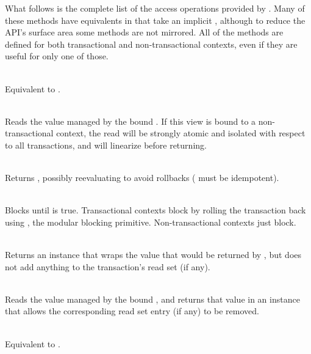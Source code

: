 What follows is the complete list of the access operations provided by
.  Many of these methods have equivalents in 
that take an implicit , although to reduce the API's surface
area some methods are not mirrored.  All of the methods are defined
for both transactional and non-transactional contexts, even if they are
useful for only one of those.

{
\setlength{\leftskip}{12pt}
\setlength{\parindent}{-12pt}
\setlength{\parskip}{3pt}

\vspace{2pt}

\\ Equivalent to .

\\ Reads the value managed by the
bound .  If this view is bound to a non-transactional context,
the read will be strongly atomic and isolated with respect to all
transactions, and will linearize before returning.

\code{map[}\code{](f: }\code{ => }\code{): }\\
Returns , possibly reevaluating 
to avoid rollbacks ( must be idempotent).

\code{ => }\code{) }\\ Blocks
until  is true.  Transactional contexts block by rolling
the transaction back using , the modular blocking primitive.
Non-transactional contexts just block.

\code{[}\code{] }\\
Returns an instance that wraps the value that would be returned by
, but does not add anything to the transaction's read set
(if any).

\code{[}\code{] }\\
Reads the value managed by the bound , and returns that
value in an instance that allows the corresponding read set entry (if any)
to be removed.

\vspace{3pt}

\code{) }\\ Equivalent to .

}
